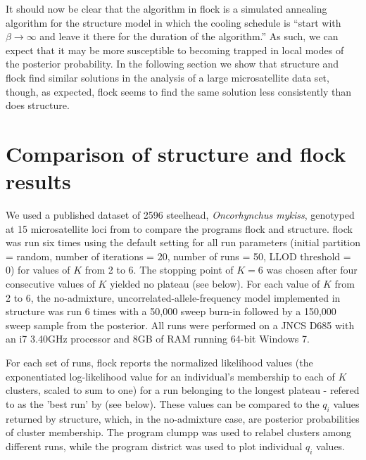 It should now be clear that the algorithm in {\sc flock} is a simulated annealing 
algorithm for the {\sc structure} model in which the cooling schedule is
``start with $\beta\rightarrow\infty$ and leave it there for the duration of 
the algorithm.''  As such, we can expect that it may be more susceptible 
to becoming trapped in local modes of the posterior probability. 
In the following section we show that {\sc structure} and {\sc flock} find similar
solutions in the analysis of a large microsatellite data set, though, as expected,
{\sc flock} seems to find the same solution less consistently than does {\sc structure}.





\section*{Comparison of {\sc structure} and {\sc flock} results}

We used a published dataset of 2596 steelhead, \textit{Oncorhynchus mykiss},
genotyped at 15 microsatellite loci from \citet{Garzaetal_norcal} to compare the programs
{\sc flock} and {\sc structure}.  {\sc flock} 
was run six times using the default setting for all 
run parameters (initial partition = random, number of iterations = 20, number of runs = 50, 
LLOD threshold = 0) for values of $K$ from 2 to 6. The stopping point of 
$K=6$ was chosen after four consecutive values of $K$
yielded no plateau (see below). For each value of $K$ from 2 to 6, the no-admixture, 
uncorrelated-allele-frequency model implemented in {\sc structure} was run 6 times with 
a 50,000 sweep burn-in followed by a 150,000 sweep sample from the posterior. 
All runs were performed on a JNCS D685 with an i7 3.40GHz processor and 8GB
of RAM running 64-bit Windows 7. 

For each set of runs, {\sc flock} reports the 
normalized likelihood values (the exponentiated log-likelihood value for an individual's 
membership to each of $K$ clusters, scaled to sum to one) for a run belonging to the longest plateau - refered to as the 'best run' by \citep{Duc&Tur2012} (see below).
These values can be compared to the $q_i$ values
returned by {\sc structure}, which, in the no-admixture case, are posterior probabilities of cluster membership.
The program {\sc clumpp} \citep{Jak&Ros2007} was used to relabel clusters among different runs,
while the program {\sc district} \citep{Rosenberg2004} was used to plot individual \textit{$q_i$} values. 

